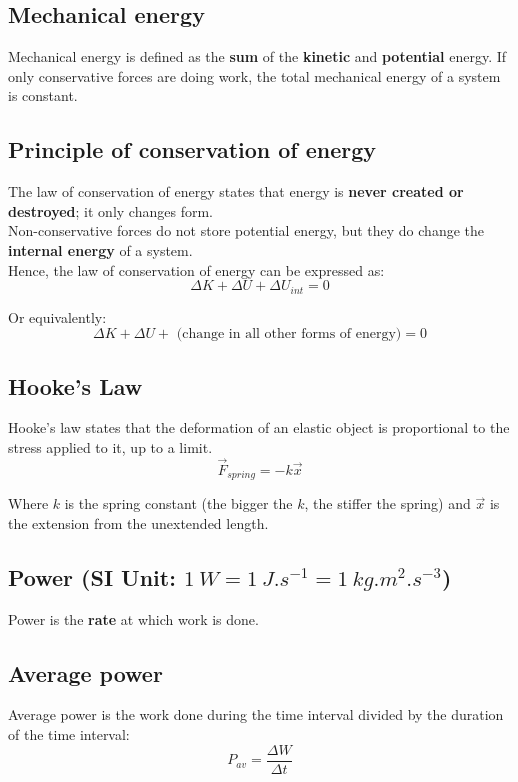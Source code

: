 \documentclass[11pt]{article}
\begin{document}
\subsection{Mechanical energy}
\label{sec:org39e8bee}
Mechanical energy is defined as the \textbf{sum} of the \textbf{kinetic} and \textbf{potential} energy. If only conservative forces are doing work, the total mechanical energy of a system is constant.

\subsection{Principle of conservation of energy}
\label{sec:org9b1482a}
The law of conservation of energy states that energy is \textbf{never created or destroyed}; it only changes form.
\\[0pt]

Non-conservative forces do not store potential energy, but they do change the \textbf{internal energy} of a system.
\\[0pt]

Hence, the law of conservation of energy can be expressed as:
\[\Delta K + \Delta U + \Delta U_{int} = 0\]

Or equivalently:
\[\Delta K + \Delta U + \text{ (change in all other forms of energy)} = 0\]

\subsection{Hooke's Law}
\label{sec:org333cfe7}
Hooke's law states that the deformation of an elastic object is proportional to the stress applied to it, up to a limit.
\[\vec{F}_{spring} = - k \vec{x}\]

Where \(k\) is the spring constant (the bigger the \(k\), the stiffer the spring) and \(\vec{x}\) is the extension from the unextended length.

\subsection{Power (SI Unit: \(\qty{1}{\unit{W}} = \qty{1}{\unit{J.s^{-1}}} = \qty{1}{\unit{kg.m^2.s^{-3}}}\))}
\label{sec:orgd27f0c4}
Power is the \textbf{rate} at which work is done.

\subsection{Average power}
\label{sec:orga53f730}
Average power is the work done during the time interval divided by the duration of the time interval:
\[P_{av} = \frac{\Delta W}{\Delta t}\]
\end{document}

